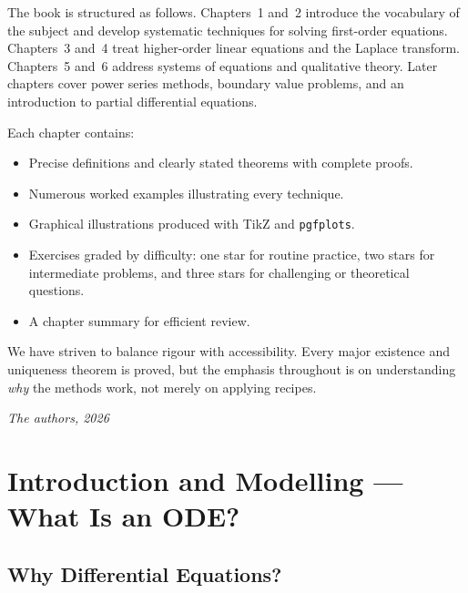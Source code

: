 \documentclass[12pt,a4paper,openany]{book}
\theoremstyle{definition}
\theoremstyle{plain}
\theoremstyle{remark}
\begin{document}
The book is structured as follows. Chapters~1 and~2 introduce the vocabulary of the subject and develop systematic techniques for solving first-order equations. Chapters~3 and~4 treat higher-order linear equations and the Laplace transform. Chapters~5 and~6 address systems of equations and qualitative theory. Later chapters cover power series methods, boundary value problems, and an introduction to partial differential equations.

Each chapter contains:
\begin{itemize}[leftmargin=2cm]
  \item Precise definitions and clearly stated theorems with complete proofs.
  \item Numerous worked examples illustrating every technique.
  \item Graphical illustrations produced with TikZ and \texttt{pgfplots}.
  \item Exercises graded by difficulty: one star for routine practice, two stars for intermediate problems, and three stars for challenging or theoretical questions.
  \item A chapter summary for efficient review.
\end{itemize}

We have striven to balance rigour with accessibility. Every major existence and uniqueness theorem is proved, but the emphasis throughout is on understanding \emph{why} the methods work, not merely on applying recipes.

\vspace{1cm}
\hfill\textit{The authors, 2026}

\tableofcontents

\mainmatter

\chapter{Introduction and Modelling --- What Is an ODE?}
\label{ch:introduction}

\section{Why Differential Equations?}
\label{sec:why-odes}
\end{document}
